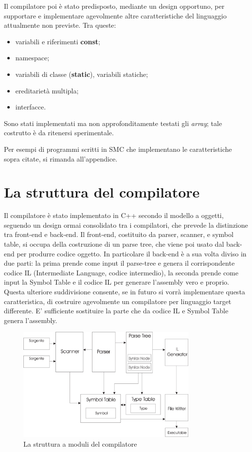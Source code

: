 \documentclass[a4paper, 11pt]{article}
\begin{document}
Il compilatore poi \`e stato predisposto, mediante un design opportuno, per supportare e implementare agevolmente altre caratteristiche del linguaggio attualmente non previste. Tra queste:

\begin{itemize}
\item variabili e riferimenti \textbf{const};
\item namespace;
\item variabili di classe (\textbf{static}), variabili statiche;
\item ereditariet\`a multipla;
\item interfacce.
\end{itemize}

Sono stati implementati ma non approfonditamente testati gli \emph{array}; tale costrutto \`e da ritenersi sperimentale.

Per esempi di programmi scritti in SMC che implementano le caratteristiche sopra citate, si rimanda all'appendice.

\section{La struttura del compilatore}

Il compilatore \`e stato implementato in C++ secondo il modello a oggetti, seguendo un design ormai consolidato tra i compilatori, che prevede la distinzione tra front-end e back-end.
Il front-end, costituito da parser, scanner, e symbol table, si occupa della costruzione di un parse tree, che viene poi usato dal back-end per produrre codice oggetto. In particolare il back-end \`e a sua volta diviso in due parti: la prima prende come input il parse-tree e genera il corrispondente codice IL (Intermediate Language, codice intermedio), la seconda prende come input la Symbol Table e il codice IL per generare l'assembly vero e proprio. Questa ulteriore suddivisione consente, se in futuro si vorr\`a implementare questa caratteristica, di costruire agevolmente un compilatore per linguaggio target differente. E' sufficiente sostituire la parte che da codice IL e Symbol Table genera l'assembly.

\begin{figure}[ht]
\centering
\includegraphics[width=0.8\textwidth]{compiler.eps}
\caption{La struttura a moduli del compilatore}
\label{fig:compiler}
\end{figure}
\end{document}
